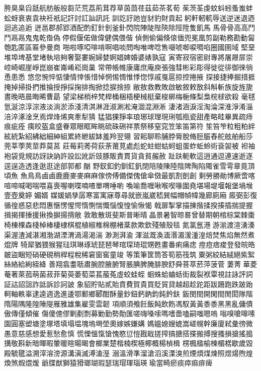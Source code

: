 胯臭臬舀舐航舫舨般芻茫荒荔荊茸荐草茵茴荏茲茹茶茗荀
茱茨荃虔蚊蚪蚓蚤蚩蚌蚣蚜衰衷袁袂衽衹記訐討訌訕訊託
訓訖訏訑豈豺豹財貢起躬軒軔軏辱送逆迷退迺迴逃追逅
迸邕郡郝郢酒配酌釘針釗釜釙閃院陣陡陛陝除陘陞隻飢馬
⾺骨⾻高⾼⾾鬥鬲⿀鬼⿁乾偺偽停假偃偌做偉健偶偎偕
偵側偷偏倏偯偭兜冕凰剪副勒務勘動匐匏匙匿區匾參曼商
啪啦啄啞啡啃啊唱啖問啕唯啤唸售啜唬啣唳啁啗圈國圉域
堅堊堆埠埤基堂堵執培夠奢娶婁婉婦婪婀娼婢婚婆婊孰寇
寅寄寂宿密尉專將屠屜屝崇崆崎崛崖崢崑崩崔崙崤崧崗巢
常帶帳帷康庸庶庵庾張強彗彬彩彫得徙從徘御徠徜恿患悉
悠您惋悴惦悽情悻悵惜悼惘惕惆惟悸惚惇戚戛扈掠控捲掖
探接捷捧掘措捱掩掉掃掛捫推掄授掙採掬排掏掀捻捩捨捺
敝敖救教敗啟敏敘敕敔斜斛斬族旋旌旎晝晚晤晨晦晞曹勗
望梁梯梢梓梵桿桶梱梧梗械梃棄梭梆梅梔條梨梟梡梂欲殺
毫毬氫涎涼淳淙液淡淌淤添淺清淇淋涯淑涮淞淹涸混淵淅
淒渚涵淚淫淘淪深淮淨淆淄涪淬涿淦烹焉焊烽烯爽牽犁猜
猛猖猓猙率琅琊球理現琍瓠瓶瓷甜產略畦畢異疏痔痕疵痊
痍皎盔盒盛眷眾眼眶眸眺硫硃硎祥票祭移窒窕笠笨笛第符
笙笞笮粒粗粕絆絃統紮紹紼絀細紳組累終紲紱缽羞羚翌翎
習耜聊聆脯脖脣脫脩脰脤舂舵舷舶船莎莞莘荸莢莖莽莫莒
莊莓莉莠荷荻荼莆莧處彪蛇蛀蚶蛄蚵蛆蛋蚱蚯蛉術袞袈被
袒袖袍袋覓規訪訝訣訥許設訟訛訢豉豚販責貫貨貪貧赧赦
趾趺軛軟這逍通逗連速逝逐逕逞造透逢逖逛途部郭都酗
野釵釦釣釧釭釩閉陪陵陳陸陰陴陶陷陬雀雪雩章竟頂頃魚
⿂鳥⿃鹵⿄鹿⿅麥⿆麻⿇傢傍傅備傑傀傖傘傚最凱割剴創
剩勞勝勛博厥啻喀喧啼喊喝喘喂喜喪喔喇喋喃喳單喟唾喲
喚喻喬喱啾喉喫喙圍堯堪場堤堰報堡堝堠壹壺奠婷媚婿
媒媛媧孳孱寒富寓寐尊尋就嵌嵐崴嵇巽幅帽幀幃幾廊廁廂
廄弼彭復循徨惑惡悲悶惠愜愣惺愕惰惻惴慨惱愎惶愉愀愒
戟扉掣掌描揀揩揉揆揍插揣提握揖揭揮捶援揪換摒揚揹敞
敦敢散斑斐斯普晰晴晶景暑智晾晷曾替期朝棺棕棠棘棗
椅棟棵森棧棹棒棲棣棋棍植椒椎棉棚楮棻款欺欽殘殖殼毯
氮氯氬港游湔渡渲湧湊渠渥渣減湛湘渤湖湮渭渦湯渴湍
渺測湃渝渾滋溉渙湎湣湄湲湩湟焙焚焦焰無然煮焜牌
犄犀猶猥猴猩琺琪琳琢琥琵琶琴琯琛琦琨甥甦畫番痢痛痣
痙痘痞痠登發皖皓皴盜睏短硝硬硯稍稈程稅稀窘窗窖童竣
等策筆筐筒答筍筋筏筑粟粥絞結絨絕紫絮絲絡給絢絰絳
善翔翕耋聒肅腕腔腋腑腎脹腆脾腌腓腴舒舜菩萃菸萍菠菅
萋菁華菱菴著萊菰萌菌菽菲菊萸萎萄菜萇菔菟虛蛟蛙蛭
蛔蛛蛤蛐蛞街裁裂袱覃視註詠評詞証詁詔詛詐詆訴診訶詖
象貂貯貼貳貽賁費賀貴買貶貿貸越超趁跎距跋跚跑跌跛跆
軻軸軼辜逮逵週逸進逶鄂郵鄉郾酣酥量鈔鈕鈣鈉鈞鈍鈐鈇
鈑閔閏開閑間閒閎隊階隋陽隅隆隍陲隄雁雅雄集雇雯雲韌
項順須飧飪飯飩飲飭馮馭黃⿈黍⿉黑⿊亂傭債傲傳僅傾催
傷傻傯僇剿剷剽募勦勤勢勣匯嗟嗨嗓嗦嗎嗜嗇嗑嗣嗤嗯嗚
嗡嗅嗆嗥嗉園圓塞塑塘塗塚塔填塌塭塊塢塒塋奧嫁嫉嫌媾
媽媼媳嫂媲嵩嵯幌幹廉廈弒彙徬微愚意慈感想愛惹愁愈慎
慌慄慍愾愴愧愍愆愷戡戢搓搾搞搪搭搽搬搏搜搔損搶搖搗
搆敬斟新暗暉暇暈暖暄暘暍會榔業楚楷楠楔極椰概楊楨楫
楞楓楹榆楝楣楛歇歲毀殿毓毽溢溯滓溶滂源溝滇滅溥溘溼
溺溫滑準溜滄滔溪溧溴煎煙煩煤煉照煜煬煦煌煥煞煆煨煖
爺牒猷獅猿猾瑯瑚瑕瑟瑞瑁琿瑙瑛瑜當畸瘀痰瘁痲痱痺

